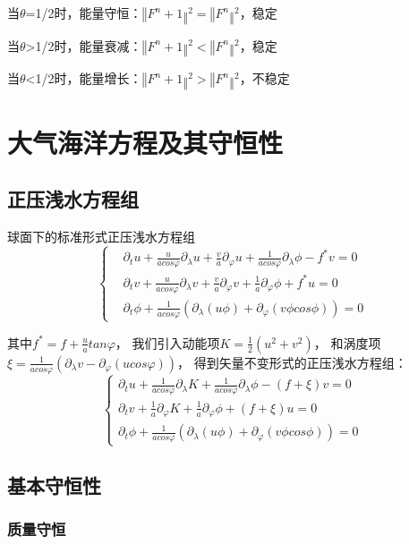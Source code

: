 \documentclass{article}
\begin{document}
当$\theta$=1/2时，能量守恒：$‖F^n+1‖^2=‖F^n‖^2$，稳定

当$\theta$>1/2时，能量衰减：$‖F^n+1‖^2<‖F^n‖^2$，稳定

当$\theta$<1/2时，能量增长：$‖F^n+1‖^2>‖F^n‖^2$，不稳定

\section{大气海洋方程及其守恒性}
\subsection{正压浅水方程组}
球面下的标准形式正压浅水方程组
$$\begin{cases}
&{\partial_{t}u + \frac{u}{acos\varphi}\partial_{\lambda}u + \frac{v}{a}\partial_{\varphi}u + \frac{1}{acos\varphi}\partial_{\lambda}\phi - f^{*}v = 0} \\
&{\partial_{t}v + \frac{u}{acos\varphi}\partial_{\lambda}v + \frac{v}{a}\partial_{\varphi}v + \frac{1}{a}\partial_{\varphi}\phi + f^{*}u = 0} \\
&{\partial_{t}\phi + \frac{1}{acos\varphi}\left( {\partial_{\lambda}\left( {u\phi} \right) + \partial_{\varphi}\left( {v\phi cos\phi} \right)} \right) = 0}
\end{cases} $$

其中$f^{*} = f + \frac{u}{a}tan\varphi$，
我们引入动能项$K = \frac{1}{2}\left( u^{2} + v^{2} \right)$，
和涡度项$\xi = \frac{1}{acos\varphi}\left( {\partial_{\lambda}v - \partial_{\varphi}\left( {ucos\varphi} \right)} \right)$，
得到矢量不变形式的正压浅水方程组：
$$\begin{cases}
{\partial_{t}u + \frac{1}{acos\varphi}\partial_{\lambda}K + \frac{1}{acos\varphi}\partial_{\lambda}\phi - \left( {f + \xi} \right)v= 0} \\
{\partial_{t}v + \frac{1}{a}\partial_{\varphi}K + \frac{1}{a}\partial_{\varphi}\phi + \left( {f + \xi} \right)u = 0} \\
{\partial_{t}\phi + \frac{1}{acos\varphi}\left( {\partial_{\lambda}\left( {u\phi} \right) + \partial_{\varphi}\left( {v\phi cos\phi} \right)} \right)= 0}
\end{cases}$$

\subsection{基本守恒性}
\subsubsection{质量守恒}
\end{document}
